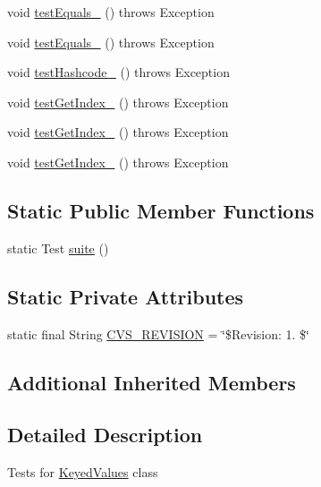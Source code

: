 \begin{DoxyCompactItemize}
\item 
void \hyperlink{classorg_1_1jgap_1_1audit_1_1_keyed_values_test_ae245c7aa5210339297304392343736a5}{test\-Equals\-\_} ()  throws Exception 
\item 
void \hyperlink{classorg_1_1jgap_1_1audit_1_1_keyed_values_test_ac996355efbe5c02041b0943806014e81}{test\-Equals\-\_} ()  throws Exception 
\item 
void \hyperlink{classorg_1_1jgap_1_1audit_1_1_keyed_values_test_a8d5053b4ae0cb014faf0acad570720ff}{test\-Hashcode\-\_} ()  throws Exception 
\item 
void \hyperlink{classorg_1_1jgap_1_1audit_1_1_keyed_values_test_af8551fefac619c27cdb43bb8efbae538}{test\-Get\-Index\-\_} ()  throws Exception 
\item 
void \hyperlink{classorg_1_1jgap_1_1audit_1_1_keyed_values_test_abd1daf6151cc88ddc36d3ea24829a121}{test\-Get\-Index\-\_} ()  throws Exception 
\item 
void \hyperlink{classorg_1_1jgap_1_1audit_1_1_keyed_values_test_a743c3c9618e92bfe18069e059fb79560}{test\-Get\-Index\-\_} ()  throws Exception 
\end{DoxyCompactItemize}
\subsection*{Static Public Member Functions}
\begin{DoxyCompactItemize}
\item 
static Test \hyperlink{classorg_1_1jgap_1_1audit_1_1_keyed_values_test_ad55946cc314d400a2de9c17b873fc922}{suite} ()
\end{DoxyCompactItemize}
\subsection*{Static Private Attributes}
\begin{DoxyCompactItemize}
\item 
static final String \hyperlink{classorg_1_1jgap_1_1audit_1_1_keyed_values_test_aa8deb6854332fc6068d33127a01d0afb}{C\-V\-S\-\_\-\-R\-E\-V\-I\-S\-I\-O\-N} = \char`\"{}\$Revision\-: 1. \$\char`\"{}
\end{DoxyCompactItemize}
\subsection*{Additional Inherited Members}


\subsection{Detailed Description}
Tests for \hyperlink{classorg_1_1jgap_1_1audit_1_1_keyed_values}{Keyed\-Values} class

